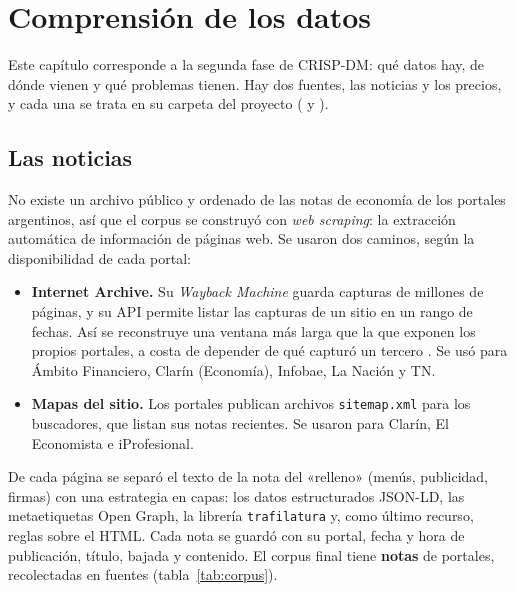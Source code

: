 \chapter{Comprensión de los datos}
\label{cap:datos}

Este capítulo corresponde a la segunda fase de CRISP-DM: qué datos hay, de dónde vienen y qué
problemas tienen. Hay dos fuentes, las noticias y los precios, y cada una se trata en su
carpeta del proyecto ( y
).

\section{Las noticias}
\label{sec:recoleccion}

No existe un archivo público y ordenado de las notas de economía de los portales argentinos, así
que el corpus se construyó con \textit{web scraping}: la extracción automática de información de
páginas web. Se usaron dos caminos, según la disponibilidad de cada portal:

\begin{itemize}
  \item \textbf{Internet Archive.} Su \textit{Wayback Machine} guarda capturas de millones de
        páginas, y su API permite listar las capturas de un sitio en un rango de fechas. Así se
        reconstruye una ventana más larga que la que exponen los propios portales, a costa de
        depender de qué capturó un tercero \citep{garg2025wayback}. Se usó para Ámbito Financiero,
        Clarín (Economía), Infobae, La Nación y TN.
  \item \textbf{Mapas del sitio.} Los portales publican archivos \texttt{sitemap.xml} para los
        buscadores, que listan sus notas recientes. Se usaron para Clarín, El Economista e
        iProfesional.
\end{itemize}

De cada página se separó el texto de la nota del «relleno» (menús, publicidad, firmas) con una
estrategia en capas: los datos estructurados JSON-LD, las metaetiquetas Open Graph, la librería
\texttt{trafilatura} \citep{barbaresi2021} y, como último recurso, reglas sobre el HTML. Cada nota
se guardó con su portal, fecha y hora de publicación, título, bajada y contenido. El corpus final
tiene \textbf{ notas} de  portales, recolectadas en
 fuentes (tabla~\ref{tab:corpus}).


